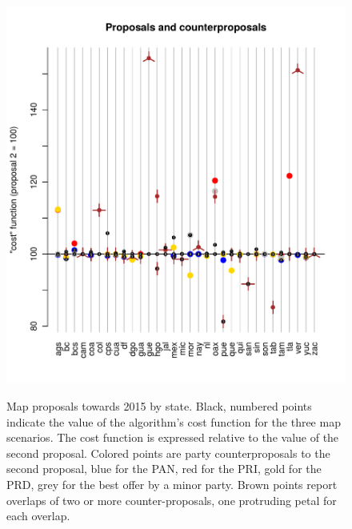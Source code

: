 \documentclass[letter,12pt]{article}
\begin{document}

\begin{figure}
\begin{center}
    \includegraphics[width=\columnwidth]{propsAndCost.pdf} \\
  \caption{Map proposals towards 2015 by state. Black, numbered points indicate the value of the algorithm's cost function for the three map scenarios. The cost function is expressed relative to the value of the second proposal. Colored points are party counterproposals to the second proposal, blue for the PAN, red for the PRI, gold for the PRD, grey for the best offer by a minor party. Brown points report overlaps of two or more counter-proposals, one protruding petal for each overlap.}\label{F:propsAndCost}
\end{center}
\end{figure}
\end{document}
